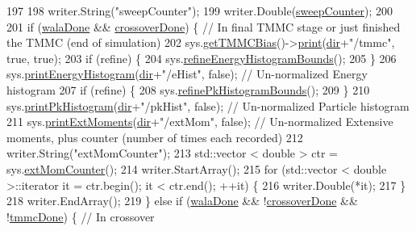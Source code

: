 \begin{DoxyCode}
197 
198     writer.String(\textcolor{stringliteral}{"sweepCounter"});
199     writer.Double(\hyperlink{classcheckpoint_ad011ddbca1ea708321335b1b3ac67e07}{sweepCounter});
200 
201     \textcolor{keywordflow}{if} (\hyperlink{classcheckpoint_aab066479e2ca6656d0031dd46a2fc1a5}{walaDone} && \hyperlink{classcheckpoint_a4f13612ea6d376bb327295bfce3a70c5}{crossoverDone}) \{ \textcolor{comment}{// In final TMMC stage or just finished the TMMC
       (end of simulation)}
202         sys.\hyperlink{classsim_system_aa31d40c91cb50f143a9613d362798887}{getTMMCBias}()->\hyperlink{classtmmc_ad49e147dc88b3e1c2975269598f94327}{print}(\hyperlink{classcheckpoint_a0e0f999ee8e0b09541e9131baa8a591d}{dir}+\textcolor{stringliteral}{"/tmmc"}, \textcolor{keyword}{true}, \textcolor{keyword}{true});
203         \textcolor{keywordflow}{if} (refine) \{
204             sys.\hyperlink{classsim_system_afe05cba714a032b445cfb1a529547833}{refineEnergyHistogramBounds}();
205         \}
206         sys.\hyperlink{classsim_system_a6ef1ba3e08ec44d865436e272cdebc9b}{printEnergyHistogram}(\hyperlink{classcheckpoint_a0e0f999ee8e0b09541e9131baa8a591d}{dir}+\textcolor{stringliteral}{"/eHist"}, \textcolor{keyword}{false}); \textcolor{comment}{// Un-normalized Energy
       histogram}
207         \textcolor{keywordflow}{if} (refine) \{
208             sys.\hyperlink{classsim_system_a1e462fcb63389d59419ff6135b2d802e}{refinePkHistogramBounds}();
209         \}
210         sys.\hyperlink{classsim_system_ac29bdd6f7fa6f9526b7eafcf658d70d8}{printPkHistogram}(\hyperlink{classcheckpoint_a0e0f999ee8e0b09541e9131baa8a591d}{dir}+\textcolor{stringliteral}{"/pkHist"}, \textcolor{keyword}{false}); \textcolor{comment}{// Un-normalized Particle histogram}
211         sys.\hyperlink{classsim_system_a2818b2f0ff79782d5443ca0f191564f8}{printExtMoments}(\hyperlink{classcheckpoint_a0e0f999ee8e0b09541e9131baa8a591d}{dir}+\textcolor{stringliteral}{"/extMom"}, \textcolor{keyword}{false}); \textcolor{comment}{// Un-normalized Extensive moments,
       plus counter (number of times each recorded)}
212         writer.String(\textcolor{stringliteral}{"extMomCounter"});
213         std::vector < double > ctr = sys.\hyperlink{classsim_system_a1744c4c22603662081d75985bc30b754}{extMomCounter}();
214         writer.StartArray();
215         \textcolor{keywordflow}{for} (std::vector < double >::iterator it = ctr.begin(); it < ctr.end(); ++it) \{
216             writer.Double(*it);
217         \}
218         writer.EndArray();
219     \} \textcolor{keywordflow}{else} \textcolor{keywordflow}{if} (\hyperlink{classcheckpoint_aab066479e2ca6656d0031dd46a2fc1a5}{walaDone} && !\hyperlink{classcheckpoint_a4f13612ea6d376bb327295bfce3a70c5}{crossoverDone} && !\hyperlink{classcheckpoint_acbe0c62aa82735741a9f396827966823}{tmmcDone}) \{ \textcolor{comment}{// In crossover
}
\end{DoxyCode}
